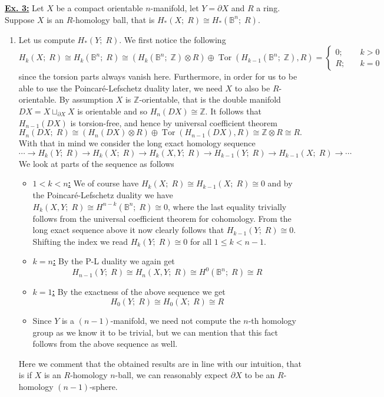 \documentclass[a4paper, 12pt]{article}
\DeclareMathOperator{\Tor}{Tor}
\newcommand{\B}{\mathbb{B}}
\newcommand{\Z}{\mathbb{Z}}
\newcommand{\iso}{\cong}
\begin{document}
\underline{\textbf{Ex. 3:}}
Let $X$ be a compact orientable $n$-manifold, let $Y = \partial X$ and $R$ a ring. Suppose $X$ is an $R$-homology ball, that is $H_*(X ; \; R) \iso H_*(\B^n ; \; R)$.
\begin{enumerate}[label=(\alph*)]
	\item Let us compute $H_*(Y ; \; R)$. We first notice the following
	\[
	H_k(X; \; R) \iso H_k(\B^n ; \; R) \iso (H_k(\B^n ; \; \Z) \otimes R) \oplus \Tor(H_{k-1}(\B^n ; \; \Z), R) =
	\begin{cases}
	0 ; &\quad k > 0 \\
	R ; &\quad k = 0
	\end{cases}
	\]
	since the torsion parts always vanish here. Furthermore, in order for us to be able to use the Poincar\'e-Lefschetz duality later, we need $X$ to also be $R$-orientable. By assumption $X$ is $\Z$-orientable, that is the double manifold $DX = X \sqcup_{\partial X} X$ is orientable and so $H_n(DX) \iso \Z$. It follows that $H_{n-1}(DX)$ is torsion-free, and hence by universal coefficient theorem
	\[
	H_n(DX;\; R) \iso (H_n(DX) \otimes R) \oplus \Tor(H_{n-1}(DX), R) \iso \Z \otimes R \iso R.
	\]
	With that in mind we consider the long exact homology sequence
	\[
	\cdots \xrightarrow{} H_k(Y ; \; R) \xrightarrow{} H_k(X ; \; R) \xrightarrow{} H_k(X, Y ; \; R) 
	\xrightarrow{} H_{k-1}(Y ; \; R) \xrightarrow{} H_{k-1}(X ; \; R) \xrightarrow{} \cdots
	\]
	We look at parts of the sequence as follows
	\begin{itemize}
		\item \underline{\textbf{$1 < k < n$:}} We of course have $H_k(X ; \; R) \iso H_{k-1}(X ; \; R) \iso 0$ and by the Poincar\'e-Lefschetz duality we have $H_k(X, Y ; \; R) \iso H^{n-k}(\B^n ; \; R) \iso 0$, where the last equality trivially follows from the universal coefficient theorem for cohomology. From the long exact sequence above it now clearly follows that $H_{k-1}(Y ; \; R) \iso 0$. Shifting the index we read $H_k(Y; \; R) \iso 0$ for all $1 \leq k < n-1$.
		\item \underline{\textbf{$k = n$:}} By the P-L duality we again get
		\[
		H_{n-1}(Y ; \; R) \iso H_n(X, Y ; \; R) \iso H^{0}(\B^n ; \; R) \iso R
		\]
		\item \underline{\textbf{$k = 1$:}} By the exactness of the above sequence we get
		\[
		H_0(Y ; \; R) \iso H_0(X ; \; R) \iso R
		\]
		\item Since $Y$ is a $(n-1)$-manifold, we need not compute the $n$-th homology group as we know it to be trivial, but we can mention that this fact follows from the above sequence as well.
	\end{itemize}
	Here we comment that the obtained results are in line with our intuition, that is if $X$ is an $R$-homology $n$-ball, we can reasonably expect $\partial X$ to be an $R$-homology $(n-1)$-sphere.
	

\end{enumerate}
\end{document}
